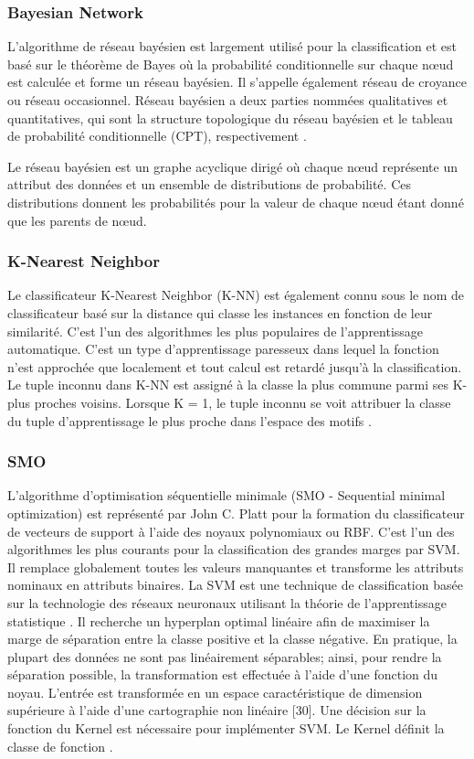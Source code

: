 \subsubsection{Bayesian Network}
L'algorithme de réseau bayésien est largement utilisé pour la classification et est basé sur le théorème de Bayes où la probabilité conditionnelle sur chaque nœud est calculée et forme un réseau bayésien. Il s'appelle également réseau de croyance ou réseau occasionnel. Réseau bayésien a deux parties nommées qualitatives et quantitatives, qui sont la structure topologique du réseau bayésien et le tableau de probabilité conditionnelle (CPT), respectivement \cite{Bayesian01}.

Le réseau bayésien est un graphe acyclique dirigé où chaque nœud représente un attribut des données et un ensemble de distributions de probabilité. Ces distributions donnent les probabilités pour la valeur de chaque nœud étant donné que les parents de nœud.

\subsubsection{K-Nearest Neighbor}
Le classificateur K-Nearest Neighbor (K-NN) \cite{ML00} est également connu sous le nom de classificateur basé sur la distance qui classe les instances en fonction de leur similarité. C'est l'un des algorithmes les plus populaires de l'apprentissage automatique. C'est un type d'apprentissage paresseux dans lequel la fonction n'est approchée que localement et tout calcul est retardé jusqu'à la classification. Le tuple inconnu dans K-NN est assigné à la classe la plus commune parmi ses K-plus proches voisins. Lorsque K = 1, le tuple inconnu se voit attribuer la classe du tuple d'apprentissage le plus proche dans l'espace des motifs \cite{ML01}.

\subsubsection{SMO}
L'algorithme d'optimisation séquentielle minimale (SMO - Sequential minimal optimization) \cite{ML29} est représenté par John C. Platt pour la formation du classificateur de vecteurs de support à l'aide des noyaux polynomiaux ou RBF. C'est l'un des algorithmes les plus courants pour la classification des grandes marges par SVM. Il remplace globalement toutes les valeurs manquantes et transforme les attributs nominaux en attributs binaires. La SVM est une technique de classification basée sur la technologie des réseaux neuronaux utilisant la théorie de l'apprentissage statistique \cite{ML30}. Il recherche un hyperplan optimal linéaire afin de maximiser la marge de séparation entre la classe positive et la classe négative. En pratique, la plupart des données ne sont pas linéairement séparables; ainsi, pour rendre la séparation possible, la transformation est effectuée à l'aide d'une fonction du noyau. L'entrée est transformée en un espace caractéristique de dimension supérieure à l'aide d'une cartographie non linéaire [30]. Une décision sur la fonction du Kernel est nécessaire pour implémenter SVM. Le Kernel définit la classe de fonction \cite{ML31}.

